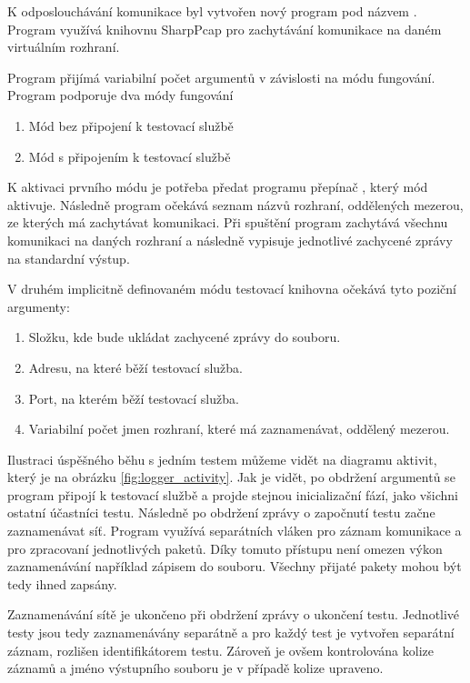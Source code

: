K odposlouchávání komunikace byl vytvořen nový program pod názvem . Program využívá knihovnu SharpPcap\cite{sharppcap} pro zachytávání komunikace na daném virtuálním rozhraní. 

Program přijímá variabilní počet argumentů v závislosti na módu fungování. Program podporuje dva módy fungování

\begin{enumerate}
    \item Mód bez připojení k testovací službě
    \item Mód s připojením k testovací službě
\end{enumerate}

K aktivaci prvního módu je potřeba předat programu přepínač , který mód aktivuje. Následně program očekává seznam názvů rozhraní, oddělených mezerou, ze kterých má zachytávat komunikaci. Při spuštění program zachytává všechnu komunikaci na daných rozhraní a následně vypisuje jednotlivé zachycené zprávy na standardní výstup.

V druhém implicitně definovaném módu testovací knihovna očekává tyto poziční argumenty:

\begin{enumerate}
    \item Složku, kde bude ukládat zachycené zprávy do souboru.
    \item Adresu, na které běží testovací služba.
    \item Port, na kterém běží testovací služba.
    \item Variabilní počet jmen rozhraní, které má zaznamenávat, oddělený mezerou.
\end{enumerate}

Ilustraci úspěšného běhu s jedním testem můžeme vidět na diagramu aktivit, který je na obrázku \ref{fig:logger_activity}. Jak je vidět, po obdržení argumentů se program připojí k testovací službě a projde stejnou inicializační fází, jako všichni ostatní účastníci testu. Následně po obdržení zprávy o započnutí testu začne zaznamenávat síť. Program využívá separátních vláken pro záznam komunikace a pro zpracovaní jednotlivých paketů. Díky tomuto přístupu není omezen výkon zaznamenávání například zápisem do souboru. Všechny přijaté pakety mohou být tedy ihned zapsány. 

Zaznamenávání sítě je ukončeno při obdržení zprávy o ukončení testu. Jednotlivé testy jsou tedy zaznamenávány separátně a pro každý test je vytvořen separátní záznam, rozlišen identifikátorem testu. Zároveň je ovšem kontrolována kolize záznamů a jméno výstupního souboru je v případě kolize upraveno. 

